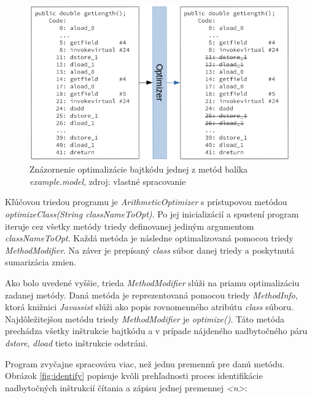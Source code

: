 \documentclass[11pt,final,oneside]{fithesis}
\begin{document}
\begin{figure}[H]
  \centering
   \includegraphics[width=\textwidth]{optimizer.png}
  \caption{Znázornenie optimalizácie bajtkódu jednej z metód balíka
  \textit{example.model}, zdroj: vlastné spracovanie}
  \label{fig:opt}
\end{figure}

Kľúčovou triedou programu je \textit{ArithmeticOptimizer} s prístupovou
metódou
\textit{optimizeClass(String classNameToOpt)}. Po jej inicializácií a spustení 
program iteruje cez všetky metódy triedy definovanej jediným argumentom 
\textit{classNameToOpt}. Každá metóda je následne optimalizovaná pomocou 
triedy \textit{MethodModifier}. Na záver je prepísaný \textit{class} súbor 
danej triedy a poskytnutá sumarizácia zmien.

Ako bolo uvedené vyššie, trieda \textit{MethodModifier} slúži na priamu 
optimalizáciu zadanej metódy. Daná metóda je reprezentovaná pomocou triedy 
\textit{MethodInfo}, ktorá knižnici \textit{Javassist} slúži ako popis 
rovnomenného atribútu \textit{class} súboru. Najdôležitejšou metódu triedy 
\textit{MethodModifier} je \textit{optimize()}. Táto metóda prechádza všetky 
inštrukcie bajtkódu a v prípade nájdeného nadbytočného páru \textit{dstore}, 
\textit{dload} tieto inštrukcie odstráni.

Program zvyčajne spracováva viac, než jednu premennú pre danú metódu. Obrázok
\ref{fig:identify} popisuje kvôli prehľadnosti proces identifikácie
nadbytočných inštrukcií čítania a zápisu jednej premennej \textit{<n>}:
\end{document}
